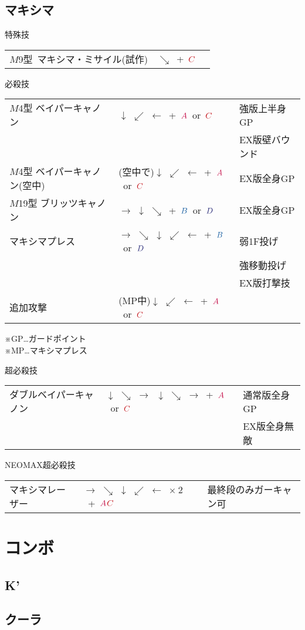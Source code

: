 \documentclass[a4j,11pt]{jarticle}
\def\A{$\textcolor{Acolor}{A}$}
\def\C{$\textcolor{Ccolor}{C}$}
\def\B{$\textcolor{Bcolor}{B}$}
\def\D{$\textcolor{Dcolor}{D}$}
\def\hado{$\downarrow$ $\searrow$ $\rightarrow$}%
\def\tatsu{$\downarrow$ $\swarrow$ $\leftarrow$}%
\def\syoryu{$\rightarrow$ $\downarrow$ $\searrow$}%
\def\gyakuyoga{$\rightarrow$ $\searrow$ $\downarrow$ $\swarrow$ $\leftarrow$}%
\begin{document}
\subsection{マキシマ}
\begin{itembox}[l]{特殊技}
\begin{tabular}{lll}
$M$9型\ マキシマ・ミサイル(試作)&$\searrow$\ +\ \C&%
\end{tabular}
\end{itembox}
\begin{itembox}[l]{必殺技}
\begin{tabular}{lll}
$M$4型 ベイパーキャノン&\tatsu\ +\ \A\ or\ \C&強版上半身GP\\%
&&EX版壁バウンド\\
$M$4型 ベイパーキャノン(空中)&(空中で)\tatsu\ +\ \A\ or\ \C&EX版全身GP\\%
$M$19型 ブリッツキャノン&\syoryu\ +\ \B\ or\ \D&EX版全身GP\\%
マキシマプレス&\gyakuyoga\ +\ \B\ or\ \D&弱1F投げ\\%
&&強移動投げ\\
&&EX版打撃技\\
追加攻撃&(MP中)\tatsu\ +\ \A\ or\ \C&
\end{tabular}
\end{itembox}
※GP…ガードポイント\\
※MP…マキシマプレス\\
\begin{itembox}[l]{超必殺技}
\begin{tabular}{lll}
ダブルベイパーキャノン&\hado\ \hado\ +\ \A\ or\ \C&通常版全身GP\\%
&&EX版全身無敵
\end{tabular}
\end{itembox}
\begin{itembox}[l]{NEOMAX超必殺技}
\begin{tabular}{lll}
マキシマレーザー&\gyakuyoga\ $\times\ 2$\ +\ \A\C&最終段のみガーキャン可%
\end{tabular}
\end{itembox}
\newpage
\section{コンボ}
\subsection{K'}
\subsection{クーラ}
\newpage
\end{document}
